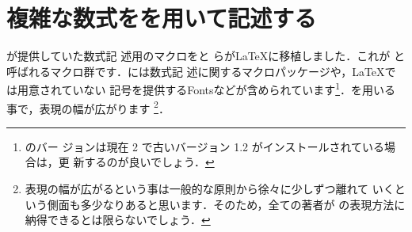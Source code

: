 \section{複雑な数式を\AmSLaTeX を用いて記述する}

が提供していた数式記
述用のマクロ\Prog[AmSTeX]{\AmSTeX}をと
らが{\LaTeX}に移植しました．これが
\Prog[AmSLaTeX]{\AmSLaTeX}と呼ばれるマクロ群です．{\AmSLaTeX}には数式記
述に関するマクロパッケージや，{\LaTeX}では用意されていない
記号を提供する{\AmS Fonts}などが含められています\footnote{\AmSLaTeX のバー
ジョンは現在 2 で古いバージョン 1.2 がインストールされている場合は，更
新するのが良いでしょう．}．\AmSLaTeX を用いる事で，表現の幅が広がります%
\footnote{表現の幅が広がるという事は一般的な原則から徐々に少しずつ離れて
いくという側面も多少なりあると思います．そのため，全ての著者が\AmSLaTeX
の表現方法に納得できるとは限らないでしょう．}．

\begin{usage}
\usepackage{amsmath}
\end{usage}


